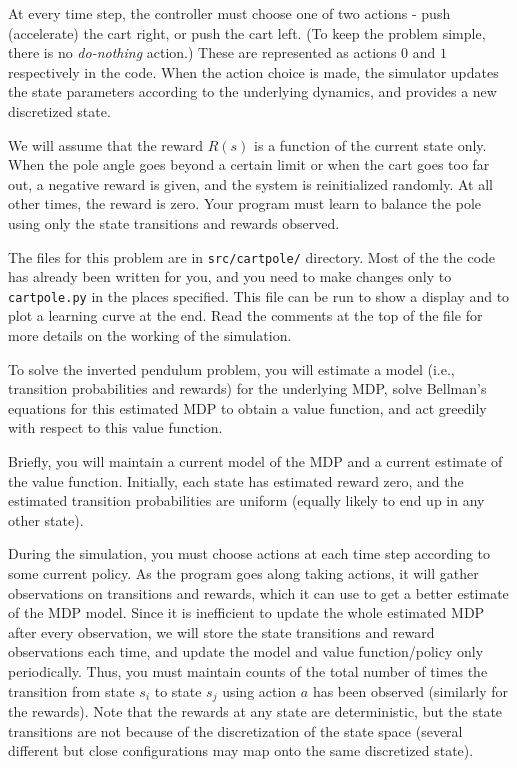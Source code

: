 At every time step, the controller must choose one of two actions -
push (accelerate) the cart right, or push the cart left.
(To keep the problem simple, there is no {\it do-nothing} action.)
These are represented as actions $0$ and $1$ respectively in the code.  
When the action choice is made, the simulator updates the state parameters 
according to the underlying dynamics, and provides a new discretized state.

We will assume that the reward $R(s)$ is a function of the current state only.
When the pole angle goes beyond a certain limit or when the cart goes
too far out, a negative reward is given, and the system is reinitialized 
randomly. At all other times, the reward is zero.  Your program must learn 
to balance the pole using only the state transitions and rewards observed.

The files for this problem are in {\tt src/cartpole/} directory.
Most of the the code has already been written for you, and you need 
to make changes only to {\tt cartpole.py} in the places specified. This 
file can be run to show a display and to plot a learning curve 
at the end.  Read the comments at the top of the file for more details
on the working of the simulation.

 To solve the inverted pendulum problem, you will estimate a 
  model (i.e., transition probabilities and rewards) for the underlying 
  MDP, solve Bellman's equations for this estimated MDP to obtain
  a value function, and act greedily with respect to this value function.  

  Briefly, you will maintain a current model of the MDP and a current
  estimate of the value function. Initially, each state has estimated reward zero,
  and the estimated transition probabilities are uniform (equally likely 
  to end up in any other state).

  During the simulation, you must choose actions at each time step 
  according to some current policy.  As the program goes along taking 
  actions, it will gather observations on transitions and rewards,
  which it can use to get a better estimate of the MDP model.
  Since it is inefficient to update the whole estimated MDP after every 
  observation, we will store the state transitions and reward observations 
  each time, and update the model and value function/policy only periodically. 
  Thus, you must maintain counts of the total number of times the 
  transition from state $s_i$ to state $s_j$ using action $a$ has been 
  observed (similarly for the rewards).  Note that the rewards at 
  any state are deterministic, but the state transitions are not because 
  of the discretization of the state space (several different but close
  configurations may map onto the same discretized state).

